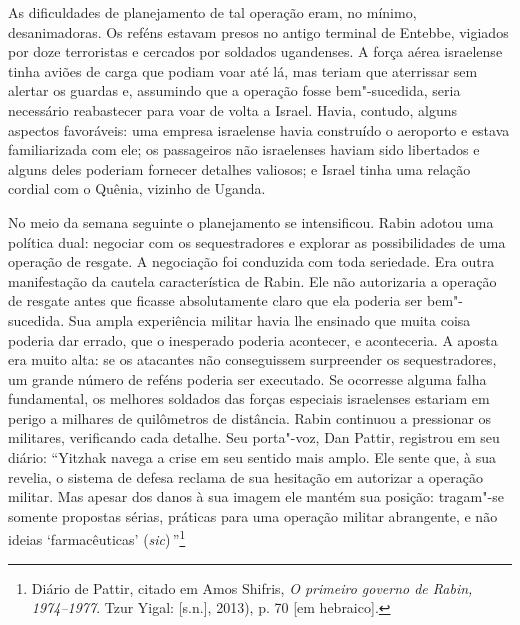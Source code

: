 As dificuldades de planejamento de tal operação eram, no mínimo,
desanimadoras. Os reféns estavam presos no antigo terminal de Entebbe,
vigiados por doze terroristas e cercados por soldados ugandenses. A
força aérea israelense tinha aviões de carga que podiam voar até lá, mas
teriam que aterrissar sem alertar os guardas e, assumindo que a operação
fosse bem"-sucedida, seria necessário reabastecer para voar de volta a
Israel. Havia, contudo, alguns aspectos favoráveis: uma empresa
israelense havia construído o aeroporto e estava familiarizada com ele;
os passageiros não israelenses haviam sido libertados e alguns deles
poderiam fornecer detalhes valiosos; e Israel tinha uma relação cordial
com o Quênia, vizinho de Uganda.

No meio da semana seguinte o planejamento se intensificou. Rabin adotou
uma política dual: negociar com os sequestradores e explorar as
possibilidades de uma operação de resgate. A negociação foi conduzida
com toda seriedade. Era outra manifestação da cautela característica de
Rabin. Ele não autorizaria a operação de resgate antes que ficasse
absolutamente claro que ela poderia ser bem"-sucedida. Sua ampla
experiência militar havia lhe ensinado que muita coisa poderia dar
errado, que o inesperado poderia acontecer, e aconteceria. A aposta era
muito alta: se os atacantes não conseguissem surpreender os
sequestradores, um grande número de reféns poderia ser executado. Se
ocorresse alguma falha fundamental, os melhores soldados das forças
especiais israelenses estariam em perigo a milhares de quilômetros de
distância. Rabin continuou a pressionar os militares, verificando cada
detalhe. Seu porta"-voz, Dan Pattir, registrou em seu diário: ``Yitzhak
navega a crise em seu sentido mais amplo. Ele sente que, à sua revelia,
o sistema de defesa reclama de sua hesitação em autorizar a operação
militar. Mas apesar dos danos à sua imagem ele mantém sua posição:
tragam"-se somente propostas sérias, práticas para uma operação militar
abrangente, e não ideias `farmacêuticas' (\emph{sic})\,''\footnote{Diário de Pattir, citado em Amos Shifris, \emph{O primeiro governo de Rabin, 1974--1977}.
Tzur Yigal: {[}s.n.{]}, 2013), p. 70 {[}em hebraico{]}.}

